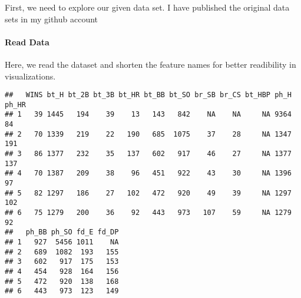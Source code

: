 \documentclass[]{article}
\newenvironment{Shaded}{\begin{snugshade}}{\end{snugshade}}
\newcommand{\DecValTok}[1]{\textcolor[rgb]{0.00,0.00,0.81}{#1}}
\newcommand{\KeywordTok}[1]{\textcolor[rgb]{0.13,0.29,0.53}{\textbf{#1}}}
\newcommand{\NormalTok}[1]{#1}
\newcommand{\OperatorTok}[1]{\textcolor[rgb]{0.81,0.36,0.00}{\textbf{#1}}}
\newcommand{\StringTok}[1]{\textcolor[rgb]{0.31,0.60,0.02}{#1}}
\let\oldparagraph\paragraph
\renewcommand{\paragraph}[1]{\oldparagraph{#1}\mbox{}}
\begin{document}
First, we need to explore our given data set. I have published the
original data sets in my github account

\hypertarget{read-data}{%
\paragraph{Read Data}\label{read-data}}

Here, we read the dataset and shorten the feature names for better
readibility in visualizations.

\begin{Shaded}
\end{Shaded}

\begin{verbatim}
##   WINS bt_H bt_2B bt_3B bt_HR bt_BB bt_SO br_SB br_CS bt_HBP ph_H ph_HR
## 1   39 1445   194    39    13   143   842    NA    NA     NA 9364    84
## 2   70 1339   219    22   190   685  1075    37    28     NA 1347   191
## 3   86 1377   232    35   137   602   917    46    27     NA 1377   137
## 4   70 1387   209    38    96   451   922    43    30     NA 1396    97
## 5   82 1297   186    27   102   472   920    49    39     NA 1297   102
## 6   75 1279   200    36    92   443   973   107    59     NA 1279    92
##   ph_BB ph_SO fd_E fd_DP
## 1   927  5456 1011    NA
## 2   689  1082  193   155
## 3   602   917  175   153
## 4   454   928  164   156
## 5   472   920  138   168
## 6   443   973  123   149
\end{verbatim}
\end{document}
